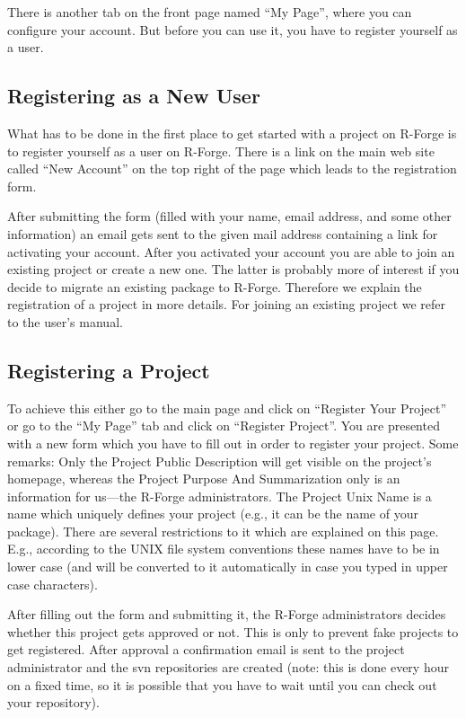 There is another tab on the front page named ``My Page'', where you
can configure your account. But before you can use it, you have to
register yourself as a user.

\subsection{Registering as a New User}

What has to be done in the first place to get started with a project
on R-Forge is to register yourself as a user on R-Forge. There is a link on
the main web site called ``New Account'' on the top right of the page
which leads to the registration form.

After submitting the form (filled with your name, email address, and
some other information) an email gets sent to the given mail
address containing a link for activating your account. After you
activated your account you are able to join an existing project or
create a new one.
The latter is probably more of interest if you decide to migrate an
existing package to R-Forge. Therefore we explain the registration 
of a project in more details. For joining an existing project we refer
to the user's manual.

\subsection{Registering a Project}

To achieve this either go to the main page and click on ``Register
Your Project'' or go to the ``My Page'' tab and click on ``Register
Project''. You are presented with a new form which you have to fill
out in order to register your project. Some remarks: Only the Project
Public Description will get visible on the project's homepage, whereas
the Project Purpose And Summarization only is an information for
us---the R-Forge administrators. The Project Unix Name is a name which
uniquely defines your project (e.g., it can be the name of your
package). There are several restrictions to it which are explained on this
page. E.g., according to the UNIX
file system conventions these names have to be in lower case (and will
be converted to it automatically in case you typed in upper case
characters).

After filling out the form and submitting it, the R-Forge
administrators decides whether this project gets approved or not. This
is only to prevent fake projects to get registered. After approval a
confirmation email is sent to the project administrator and the svn
repositories are created (note: this is done every hour on a fixed
time, so it is possible that you have to wait until you can check out
your repository).

